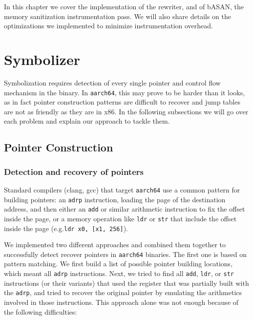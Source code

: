 \documentclass[a4paper,11pt,oneside]{report}
\begin{document}

In this chapter we cover the implementation of the rewriter, and of bASAN, the memory
sanitization instrumentation pass. We will also share details on the optimizations
we implemented to minimize instrumentation overhead.

\section{Symbolizer}


Symbolization requires detection of every single pointer and control flow
mechanism in the binary. In \texttt{aarch64}, this may prove to be harder than
it looks, as in fact pointer construction patterns are difficult to recover
and jump tables are not as friendly as they are in x86. 
In the following subsections we will go over each problem and explain our
approach to tackle them. 



\subsection{Pointer Construction}

\subsubsection{Detection and recovery of pointers}

Standard compilers (clang, gcc) that target \texttt{aarch64} use a common 
pattern for building pointers: an \texttt{adrp} instruction, loading the page 
of the destination address, and then either an \texttt{add} or similar arithmetic 
instruction to fix the offset inside the page, or a memory operation like 
\texttt{ldr} or \texttt{str} that include the offset inside the page 
(e.g.\texttt{ldr x0, [x1, 256]}).

We implemented two different approaches and combined them together to 
successfully detect recover pointers in \texttt{aarch64} binaries.
The first one is based on pattern matching. We first build a list of 
possible pointer building locations, which meant all \texttt{adrp} 
instructions. Next, we tried to find all \texttt{add}, \texttt{ldr}, or 
\texttt{str} instructions (or their variants) that used the register that was 
partially built with the \texttt{adrp}, and tried to recover the original
pointer by emulating the arithmetics involved in those instructions.
This approach alone was not enough because of the following 
difficulties:
\end{document}
